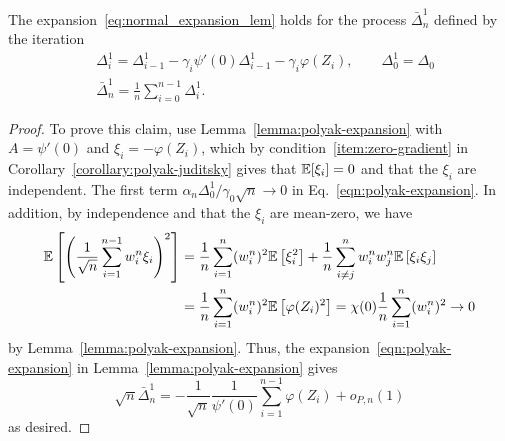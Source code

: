 \begin{lemma}
  The expansion~\eqref{eq:normal_expansion_lem} holds for the process
  $\bar{\Delta}^1_n$ defined by the iteration
  \begin{align}
    \label{eqn:polyak-expansion_lem1_alg}
    & \Delta_i^1  = \Delta_{i-1}^1 - \gamma_i \psi'(0) \Delta_{i-1}^1 - \gamma_i \varphi(Z_i), \qquad
    \Delta_0^1 = \Delta_0\\
    & \bar{\Delta}^1_n = \frac{1}{n}\sum_{i=0}^{n-1} \Delta^1_i.
    \nonumber
  \end{align}
\end{lemma}
\begin{proof}
  To prove this claim, use Lemma~\ref{lemma:polyak-expansion} with $A =
  \psi'(0)$ and $\xi_i = -\varphi(Z_i)$, which by
  condition~\eqref{item:zero-gradient} in
  Corollary~\ref{corollary:polyak-juditsky} gives that
  $\mathbb{E}[\xi_i] = 0$ and that the $\xi_i$ are independent.
  The first term $\alpha_n \Delta_0^1 / \gamma_0 \sqrt{n} \to 0$
  in Eq.~\eqref{eqn:polyak-expansion}. In addition,
  by independence and that the $\xi_i$ are mean-zero, we have
  \begin{align*}
    \mathbb{E}\left[  \left( \frac{1}{\sqrt{n}} \sum_{i=1}^{n-1} w_i^n \xi_i \right)^2 \right]
    & = \frac{1}{n}  \sum_{i=1}^n (w_i^n)^2 \mathbb{E}\left[  \xi_i^2\right] + \frac{1}{n}  \sum_{i\neq j}^n w_i^n w_j^n \mathbb{E}\left[  \xi_i \xi_j\right] \\
    & = \frac{1}{n}  \sum_{i=1}^n (w_i^n)^2 \mathbb{E}\left[  \varphi(Z_i)^2\right] = \chi(0) \frac{1}{n}  \sum_{i=1}^n (w_i^n)^2 \to 0
  \end{align*}
  by Lemma~\ref{lemma:polyak-expansion}.
  Thus, the expansion~\eqref{eqn:polyak-expansion} in
  Lemma~\ref{lemma:polyak-expansion} gives
  \begin{equation*}
    \sqrt{n} \bar{\Delta}^1_n
    = -\frac{1}{\sqrt{n}} \frac{1}{\psi'(0)}
    \sum_{i=1}^{n-1} \varphi(Z_i)+ o_{P,n}(1)
  \end{equation*}
  as desired.
\end{proof}

